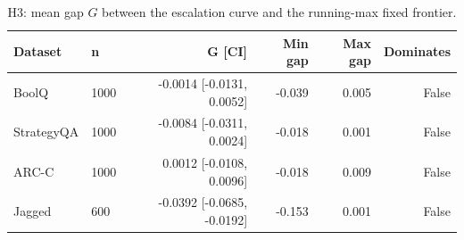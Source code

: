 \begin{table}[h!]
\centering
\small
\caption{H3: mean gap $G$ between the escalation curve and the running-max fixed frontier.}
\label{tab:h3}
\begin{tabular}{llrrrr}
\toprule
Dataset & n & G [CI] & Min gap & Max gap & Dominates \\
\midrule
BoolQ & 1000 & -0.0014 [-0.0131, 0.0052] & -0.039 & 0.005 & False \\
StrategyQA & 1000 & -0.0084 [-0.0311, 0.0024] & -0.018 & 0.001 & False \\
ARC-C & 1000 & 0.0012 [-0.0108, 0.0096] & -0.018 & 0.009 & False \\
Jagged & 600 & -0.0392 [-0.0685, -0.0192] & -0.153 & 0.001 & False \\
\bottomrule
\end{tabular}
\end{table}
